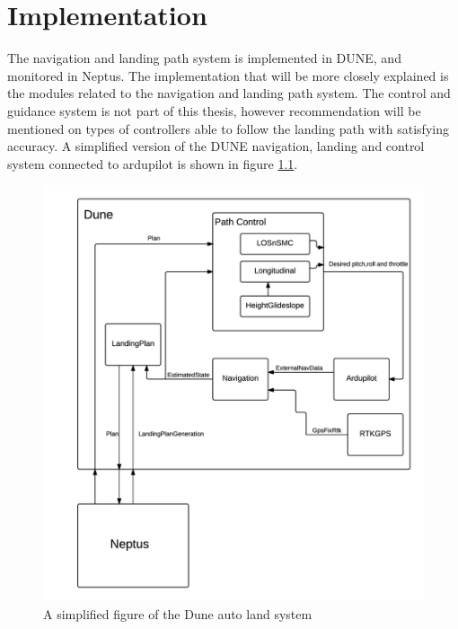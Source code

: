 \chapter{Implementation}
The navigation and landing path system is implemented in DUNE, and monitored in Neptus. The implementation that will be more closely explained is the modules related to the navigation and landing path system. The control and guidance system is not part of this thesis, however recommendation will be mentioned on types of controllers able to follow the landing path with satisfying accuracy. A simplified version of the DUNE navigation, landing and control system connected to ardupilot is  shown in figure \ref{fig:DuneSystem}.
\newpage
\begin{figure}[H]
	\centering
		\includegraphics[width=1\textwidth]{figs/DUNESystem.png}
		\caption{A simplified figure of the Dune auto land system}
		\label{fig:DuneSystem}
\end{figure}
